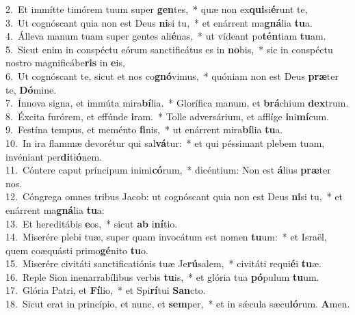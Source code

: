 {2.~}Et immítte timórem tuum super \textbf{gen}tes,~* quæ non ex\textbf{qui}si\textbf{é}runt te,\\
{3.~}Ut cognóscant quia non est Deus \textbf{ni}si tu,~* et enárrent ma\textbf{gná}lia \textbf{tu}a.\\
{4.~}Álleva manum tuam super gentes ali\textbf{é}nas,~* ut vídeant po\textbf{tén}tiam \textbf{tu}am.\\
{5.~}Sicut enim in conspéctu eórum sanctificátus es in \textbf{no}bis,~* sic in conspéctu nostro magnificábe\textbf{ris} in \textbf{e}is,\\
{6.~}Ut cognóscant te, sicut et nos co\textbf{gnó}vimus,~* quóniam non est Deus \textbf{præ}ter te, \textbf{Dó}mine.\\
{7.~}Ínnova signa, et immúta mira\textbf{bí}lia.~* Glorífica manum, et \textbf{brá}chium \textbf{dex}trum.\\
{8.~}Éxcita furórem, et effúnde \textbf{i}ram.~* Tolle adversárium, et afflíge \textbf{i}ni\textbf{mí}cum.\\
{9.~}Festína tempus, et meménto \textbf{fi}nis,~* ut enárrent mira\textbf{bí}lia \textbf{tu}a.\\
{10.~}In ira flammæ devorétur qui sal\textbf{vá}tur:~* et qui péssimant plebem tuam, invéniant per\textbf{di}ti\textbf{ó}nem.\\
{11.~}Cóntere caput príncipum inimi\textbf{có}rum,~* dicéntium: Non est \textbf{á}lius \textbf{præ}ter nos.\\
{12.~}Cóngrega omnes tribus Jacob: ut cognóscant quia non est Deus \textbf{ni}si tu,~* et enárrent ma\textbf{gná}lia \textbf{tu}a:\\
{13.~}Et hereditábis \textbf{e}os,~* sicut \textbf{ab} i\textbf{ní}tio.\\
{14.~}Miserére plebi tuæ, super quam invocátum est nomen \textbf{tu}um:~* et Israël, quem coæquásti primo\textbf{gé}nito \textbf{tu}o.\\
{15.~}Miserére civitáti sanctificatiónis tuæ Je\textbf{rú}salem,~* civitáti requi\textbf{é}i \textbf{tu}æ.\\
{16.~}Reple Sion inenarrabílibus verbis \textbf{tu}is,~* et glória tua \textbf{pó}pulum \textbf{tu}um.\\
{17.~}Glória Patri, et \textbf{Fí}lio,~* et Spi\textbf{rí}tui \textbf{San}cto.\\
{18.~}Sicut erat in princípio, et nunc, et \textbf{sem}per,~* et in sǽcula sæcu\textbf{ló}rum. \textbf{A}men.\\
